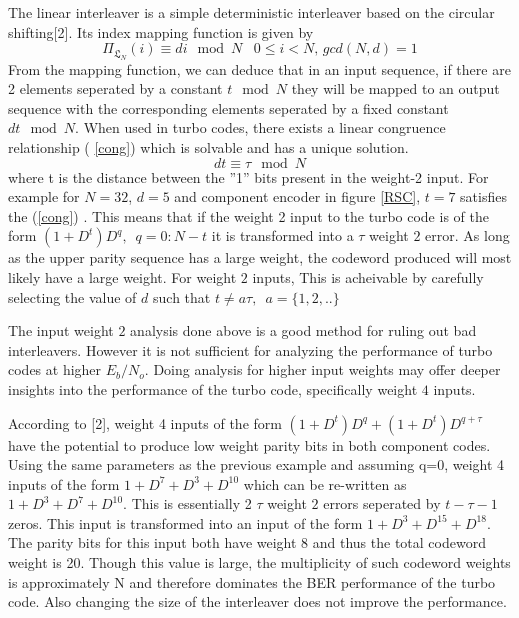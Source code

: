 \documentclass[twocolumn]{article}
\begin{document}
The linear interleaver is a simple deterministic interleaver based on the circular shifting[2].
Its index mapping function is given by 
\begin{equation}
 \Pi_{\mathfrak{L}_N}(i) \equiv di \mod N \,\,\,\,\, 0 \leq i < N, \, gcd(N,d)=1
\end{equation}
From the mapping function, we can deduce that in an input sequence,
if there are 2 elements seperated by
a constant $t\mod N$ they will be mapped to an output sequence with the corresponding
elements seperated by a fixed constant $dt \mod N$. When used in turbo codes, there
exists a linear congruence relationship ( \ref{cong}) 
which is solvable and has a unique solution.
 \begin{equation} 
 dt \equiv \tau \mod N
 \label{cong}
 \end{equation}
where t is the distance between the ''1'' bits present in the weight-2 input.
For example for $N=32$, $d=5$ and component encoder in figure \ref{RSC}, 
$t=7$ satisfies the (\ref{cong}) . This means
that if the weight 2 input to the turbo code is of the form $(1+D^t)D^q,
\,\,\, q=0:N-t$ it is transformed
into a $\tau$ weight $2$ error. As long as the upper parity sequence has a large weight,
the codeword produced will most likely have a large weight. For weight $2$ inputs,
This is acheivable by 
carefully selecting the value of $d$ such that $t\neq a\tau,\,\,\, a=\{1,2,..\}$

The input weight $2$ analysis done above is a good method for ruling out bad interleavers.
However it is not sufficient for analyzing the performance of turbo codes at higher
$E_b/ N_o$. Doing analysis for higher input weights may offer deeper insights into
the performance of the turbo code, specifically weight $4$ inputs.

According to [2], weight 4 inputs of the form $(1+D^t)D^q+(1+D^t)D^{q+\tau}$
have the potential to produce low weight parity bits in both component codes. Using the 
same parameters as the previous example and assuming q=0, weight 4 inputs of the
form $1+D^7+D^3 +D^10$ which can be re-written as $1+D^3+D^7 +D^10$.
This is essentially 2 $\tau$ weight $2$ errors seperated by $t-\tau -1$ zeros. This input
is transformed into an input of the form $1+D^3+D^{15}+D^{18}$. The parity
bits for this input both have weight 8 and thus the total codeword weight is 20.
Though this value is large, the multiplicity of such codeword weights is approximately
N and therefore dominates the BER performance of the turbo code. Also changing the
size of the interleaver does not improve the performance.
\end{document}
